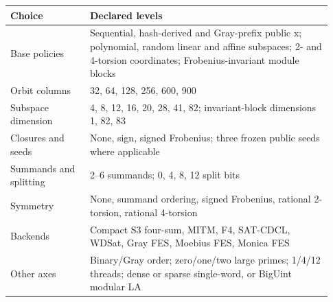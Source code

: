 \documentclass[11pt]{article}
\begin{document}
\begin{tabular}{p{0.23\linewidth}p{0.70\linewidth}}
\toprule
Choice & Declared levels\\
\midrule
Base policies & Sequential, hash-derived and Gray-prefix public x; polynomial, random linear and affine subspaces; 2- and 4-torsion coordinates; Frobenius-invariant module blocks\\
Orbit columns & 32, 64, 128, 256, 600, 900\\
Subspace dimension & 4, 8, 12, 16, 20, 28, 41, 82; invariant-block dimensions 1, 82, 83\\
Closures and seeds & None, sign, signed Frobenius; three frozen public seeds where applicable\\
Summands and splitting & 2--6 summands; 0, 4, 8, 12 split bits\\
Symmetry & None, summand ordering, signed Frobenius, rational 2-torsion, rational 4-torsion\\
Backends & Compact S3 four-sum, MITM, F4, SAT-CDCL, WDSat, Gray FES, Moebius FES, Monica FES\\
Other axes & Binary/Gray order; zero/one/two large primes; 1/4/12 threads; dense or sparse single-word, or BigUint modular LA\\
\bottomrule
\end{tabular}
\end{document}
